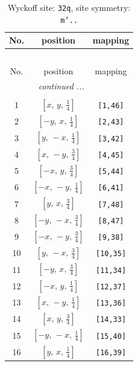 \documentclass[fleqn,8pt]{jsarticle}
\begin{document}
\begin{longtable}{ccc}
\caption{Wyckoff site: {\tt 32q}, site symmetry: {\tt m'..}}
 \\
 \hline \hline
No. & position & mapping \\ \hline \endfirsthead

\multicolumn{2}{l}{\tablename\ \thetable{}} \\
 \hline \hline
No. & position & mapping \\ \hline \endhead

 \hline \hline
\multicolumn{2}{r}{\footnotesize\it continued ...} \\ \endfoot

 \hline \hline
\multicolumn{2}{r}{} \\ \endlastfoot

1 & $\left[ x,\, y,\, \frac{1}{4} \right]$ & {\tt [1,46]} \\ \hline
2 & $\left[ - y,\, x,\, \frac{1}{4} \right]$ & {\tt [2,43]} \\ \hline
3 & $\left[ y,\, - x,\, \frac{1}{4} \right]$ & {\tt [3,42]} \\ \hline
4 & $\left[ x,\, - y,\, \frac{3}{4} \right]$ & {\tt [4,45]} \\ \hline
5 & $\left[ - x,\, y,\, \frac{3}{4} \right]$ & {\tt [5,44]} \\ \hline
6 & $\left[ - x,\, - y,\, \frac{1}{4} \right]$ & {\tt [6,41]} \\ \hline
7 & $\left[ y,\, x,\, \frac{3}{4} \right]$ & {\tt [7,48]} \\ \hline
8 & $\left[ - y,\, - x,\, \frac{3}{4} \right]$ & {\tt [8,47]} \\ \hline
9 & $\left[ - x,\, - y,\, \frac{3}{4} \right]$ & {\tt [9,38]} \\ \hline
10 & $\left[ y,\, - x,\, \frac{3}{4} \right]$ & {\tt [10,35]} \\ \hline
11 & $\left[ - y,\, x,\, \frac{3}{4} \right]$ & {\tt [11,34]} \\ \hline
12 & $\left[ - x,\, y,\, \frac{1}{4} \right]$ & {\tt [12,37]} \\ \hline
13 & $\left[ x,\, - y,\, \frac{1}{4} \right]$ & {\tt [13,36]} \\ \hline
14 & $\left[ x,\, y,\, \frac{3}{4} \right]$ & {\tt [14,33]} \\ \hline
15 & $\left[ - y,\, - x,\, \frac{1}{4} \right]$ & {\tt [15,40]} \\ \hline
16 & $\left[ y,\, x,\, \frac{1}{4} \right]$ & {\tt [16,39]} \\ \hline

\end{longtable}
\end{document}
